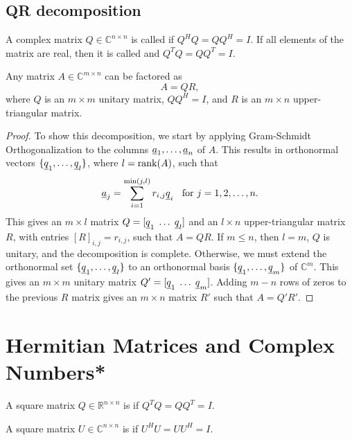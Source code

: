 \subsection{QR decomposition}

A complex matrix $Q \in \mathbb{C}^{n \times n}$ is called  if $Q^H Q = Q Q^H = I$.
If all elements of the matrix are real, then it is called  and $Q^T Q = Q Q^T = I$.

\begin{theorem}
Any matrix $A \in \mathbb{C}^{m \times n}$ can be factored as
\begin{equation*}
A = Q R,
\end{equation*}
where $Q$ is an $m\times m$ unitary matrix, $QQ^H = I$, and $R$ is an $m\times n$ upper-triangular matrix.
\end{theorem}
\begin{proof}
To show this decomposition, we start by applying Gram-Schmidt Orthogonalization to the columns $\underline{a}_1,\ldots,\underline{a}_n$ of $A$.
This results in orthonormal vectors $\{ \underline{q}_1,\ldots,\underline{q}_l \}$, where $l=\mathrm{rank}(A)$, such that
\[ \underline{a}_j = \sum_{i=1}^{\min(j,l)} r_{i,j} \underline{q}_i \;\; \textrm{ for } j=1,2,\ldots,n. \]
This gives an $m\times l$ matrix $Q=[ \underline{q}_1 \; \ldots \; \underline{q}_l ]$ and an $l \times n$ upper-triangular matrix $R$, with entries $[ R ]_{i,j} = r_{i,j}$, such that $A = QR$.
If $m \leq n$, then $l=m$, $Q$ is unitary, and the decomposition is complete.
Otherwise, we must extend the orthonormal set $\{ \underline{q}_1,\ldots,\underline{q}_l \}$ to an orthonormal basis $\{ \underline{q}_1,\ldots,\underline{q}_m \}$ of $\mathbb{C}^m$.
This gives an $m\times m$ unitary matrix $Q' = [ \underline{q}_1 \; \ldots \; \underline{q}_m ]$.
Adding $m-n$ rows of zeros to the previous $R$ matrix gives an $m\times n$ matrix $R'$ such that $A = Q' R'$.
\end{proof}

\section{Hermitian Matrices and Complex Numbers*}

\begin{definition}
A square matrix $Q \in \mathbb{R}^{n \times n}$ is  if $Q^T Q = Q Q^T = I$.
\end{definition}

\begin{definition}
A square matrix $U \in \mathbb{C}^{n \times n}$ is  if $U^H U = U U^H = I$.
\end{definition}

